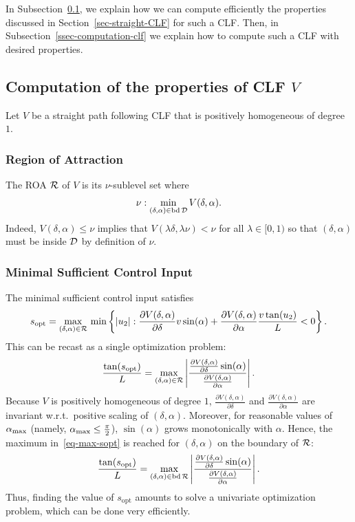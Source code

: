 \documentclass{article}
\theoremstyle{plain}
\theoremstyle{definition}
\theoremstyle{remark}
\newcommand{\sopt}{s_{\mathrm{opt}}}
\newcommand{\alphamax}{\alpha_\maxtxt}
\begin{document}
In Subsection~\ref{ssec-computation-properties}, we explain how we can compute efficiently the properties
discussed in Section~\ref{sec-straight-CLF} for such a CLF.
Then, in Subsection~\ref{ssec-computation-clf} we explain how to compute such
a CLF with desired properties.

\subsection{Computation of the properties of CLF $V$}\label{ssec-computation-properties}

Let $V$ be a straight path following CLF that is positively homogeneous of degree $1$.

\subsubsection{Region of Attraction}

The ROA $\mathcal{R}$ of $V$ is its $\nu$-sublevel set where
\[
\nu:\min_{(\delta,\alpha)\in\mathrm{bd}\,\mathcal{D}} V(\delta,\alpha).
\]
Indeed, $V(\delta,\alpha)\leq\nu$ implies that $V(\lambda\delta,\lambda\nu)<\nu$
for all $\lambda\in[0,1)$ so that $(\delta,\alpha)$ must be inside $\mathcal{D}$ by definition of $\nu$.

\subsubsection{Minimal Sufficient Control Input}

The minimal sufficient control input satisfies
\[
\sopt=\max_{(\delta,\alpha)\in\calR}\,\min\left\{\lvert u_2\rvert:\frac{\partial V(\delta,\alpha)}{\partial\delta}v\sin(\alpha)+\frac{\partial V(\delta,\alpha)}{\partial\alpha}\frac{v\tan(u_2)}L<0\right\}.
\]
This can be recast as a single optimization problem:
\begin{equation}\label{eq-max-sopt}
\frac{\tan(\sopt)}L = \max_{(\delta,\alpha)\in\calR}\left\lvert\frac{\frac{\partial V(\delta,\alpha)}{\partial\delta}\sin(\alpha)}{\frac{\partial V(\delta,\alpha)}{\partial\alpha}}\right\rvert.
\end{equation}
Because $V$ is positively homogeneous of degree $1$,
$\frac{\partial V(\delta,\alpha)}{\partial\delta}$ and $\frac{\partial V(\delta,\alpha)}{\partial\alpha}$
are invariant w.r.t.~positive scaling of $(\delta,\alpha)$.
Moreover, for reasonable values of $\alphamax$ (namely, $\alphamax\leq\frac\pi2$),
$\sin(\alpha)$ grows monotonically with $\alpha$.
Hence, the maximum in~\eqref{eq-max-sopt} is reached for $(\delta,\alpha)$ on the boundary of $\mathcal{R}$:
\begin{equation}\label{eq-max-sopt-boundary}
\frac{\tan(\sopt)}L = \max_{(\delta,\alpha)\in\mathrm{bd}\,\calR}\left\lvert\frac{\frac{\partial V(\delta,\alpha)}{\partial\delta}\sin(\alpha)}{\frac{\partial V(\delta,\alpha)}{\partial\alpha}}\right\rvert.
\end{equation}
Thus, finding the value of $\sopt$ amounts to solve
a univariate optimization problem, which can be done very efficiently.
\end{document}
